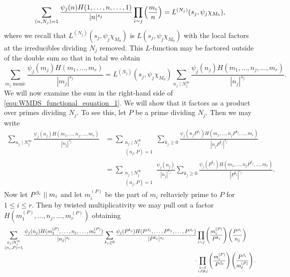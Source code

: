     \[
        \sum_{(n,N_{j}) = 1}\frac{\psi_{j}(n)H(1,\ldots,n,\ldots,1)}{|n|^{s_{j}}}\prod_{\substack{i \sim j}}\left(\frac{m_{i}}{n}\right) = L^{(N_{j})}(s_{j},\psi_{j}\chi_{M_{0}}),
    \]
    where we recall that $L^{(N_{j})}(s_{j},\psi_{j}\chi_{M_{0}})$ is $L(s_{j},\psi_{j}\chi_{M_{0}})$ with the local factors at the irreducibles dividing $N_{j}$ removed. This $L$-function may be factored outside of the double sum so that in total we obtain
    \begin{equation}\label{equ:WMDS_functional_equation_1}
        \sum_{\text{$m_{j}$ monic}}\frac{\psi_{j}(m_{j})H(m_{1},\ldots,m_{r})}{|m_{j}|^{s_{j}}} = L^{(N_{j})}(s_{j},\psi_{j}\chi_{M_{0}})\sum_{n_{j} \mid N_{j}^{\infty}}\frac{\psi_{j}(n_{j})H(m_{1},\ldots,n_{j},\ldots,m_{r})}{|n_{j}|^{s_{j}}}.
    \end{equation}
    We will now examine the sum in the right-hand side of \cref{equ:WMDS_functional_equation_1}. We will show that it factors as a product over primes dividing $N_{j}$. To see this, let $P$ be a prime dividing $N_{j}$. Then we may write
    \begin{align*}
        \sum_{n_{j} \mid N_{j}^{\infty}}\frac{\psi_{j}(n_{j})H(m_{1},\ldots,n_{j},\ldots,m_{r})}{|n_{j}|^{s_{j}}} &= \sum_{\substack{n_{j} \mid N_{j}^{\infty} \\ (n_{j},P) = 1}}\sum_{k_{j} \ge 0}\frac{\psi_{j}(n_{j}P^{k_{j}})H(m_{1},\ldots,n_{j}P^{k_{j}},\ldots,m_{r})}{|n_{j}P^{k_{j}}|^{s_{j}}} \\
        &= \sum_{\substack{n_{j} \mid N_{j}^{\infty} \\ (n_{j},P) = 1}}\frac{\psi_{j}(n_{j})}{|n_{j}|^{s_{j}}}\sum_{k_{j} \ge 0}\frac{\psi_{j}(P^{k_{j}})H(m_{1},\ldots,n_{j}P^{k_{j}},\ldots,m_{r})}{|P^{k_{j}}|^{s_{j}}}.
    \end{align*}
    Now let $P^{\beta_{i}} \mid\mid m_{i}$ and let $m_{i}^{(P)}$ be the part of $m_{i}$ reltaviely prime to $P$ for $1 \le i \le r$. Then by twisted multiplicativity we may pull out a factor $H(m_{1}^{(P)},\ldots,n_{j},\ldots,m_{r}^{(P)})$ obtaining
    \begin{align*}
        \sum_{\substack{n_{j} \mid N_{j}^{\infty} \\ (n_{j},P) = 1}}\frac{\psi_{j}(n_{j})H(m_{1}^{(P)},\ldots,n_{j},\ldots,m_{r}^{(P)})}{|n_{j}|^{s_{j}}}\sum_{k_{j} \ge 0}\frac{\psi_{j}(P^{k_{j}})H(P^{\beta_{1}},\ldots,P^{k_{j}},\ldots,P^{\beta_{r}})}{|P^{k_{j}}|^{s_{j}}}&\prod_{\substack{i \sim j}}\left(\frac{m_{i}^{(P)}}{P^{k_{j}}}\right)\left(\frac{P^{\beta_{i}}}{n_{j}}\right) \\
        \cdot &\prod_{\substack{i \sim \ell \\ i,\ell \neq j}}\left(\frac{m_{i}^{(P)}}{P^{\beta_{\ell}}}\right)\left(\frac{P^{\beta_{i}}}{m_{\ell}^{(P)}}\right).
    \end{align*}
